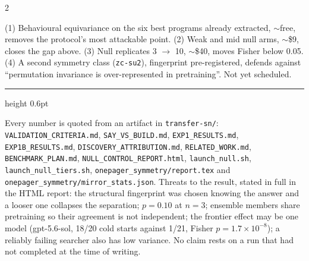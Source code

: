 \documentclass[9pt]{extarticle}
\newcommand{\shead}[1]{\vspace{3.5pt}{\color{accc}\bfseries\footnotesize\MakeUppercase{#1}}\par\vspace{1pt}}
\begin{document}
\begin{multicols}{2}
\shead{Next, by value per dollar}
{\footnotesize
(1) Behavioural equivariance on the six best programs already extracted, $\sim$free, removes the
protocol's most attackable point. (2) Weak and mid null arms, $\sim$\$9, closes the gap above.
(3) Null replicates 3 $\to$ 10, $\sim$\$40, moves Fisher below 0.05. (4) A second symmetry class
(\texttt{zc-su2}), fingerprint pre-registered, defends against ``permutation invariance is
over-represented in pretraining''. Not yet scheduled.}

\end{multicols}

\vspace{-2pt}
{\color{rulec}\hrule height 0.6pt}
\vspace{3pt}
{\fontsize{6.6}{7.8}\selectfont
Every number is quoted from an artifact in \texttt{transfer-sn/}: \texttt{VALIDATION\_CRITERIA.md},
\texttt{SAY\_VS\_BUILD.md}, \texttt{EXP1\_RESULTS.md}, \texttt{EXP1B\_RESULTS.md},
\texttt{DISCOVERY\_ATTRIBUTION.md}, \texttt{RELATED\_WORK.md}, \texttt{BENCHMARK\_PLAN.md},
\texttt{NULL\_CONTROL\_REPORT.html}, \texttt{launch\_null.sh}, \texttt{launch\_null\_tiers.sh},
\texttt{onepager\_symmetry/report.tex} and \texttt{onepager\_symmetry/mirror\_stats.json}.
Threats to the result, stated in full in the HTML report: the structural fingerprint was chosen
knowing the answer and a looser one collapses the separation; $p=0.10$ at $n=3$; ensemble members
share pretraining so their agreement is not independent; the frontier effect may be one model
(gpt-5.6-sol, 18/20 cold starts against 1/21, Fisher $p=1.7\times10^{-8}$); a reliably failing
searcher also has low variance. No claim rests on a run that had not completed at the time of writing.\par}
\end{document}
